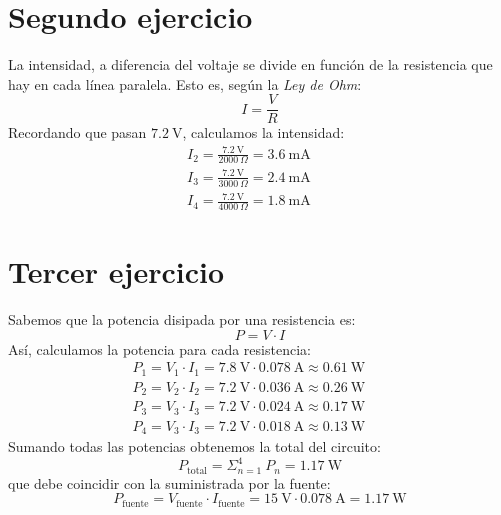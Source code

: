 \documentclass{article}
\newcommand{\tmem}[1]{{\em #1\/}}
\newcommand{\tmop}[1]{\ensuremath{\operatorname{#1}}}
\begin{document}
\section{Segundo ejercicio}

La intensidad, a diferencia del voltaje se divide en funci{\'o}n de la
resistencia que hay en cada l{\'i}nea paralela. Esto es, seg{\'u}n la
{\tmem{Ley de Ohm}}:
\begin{equation}
  I = \frac{V}{R}
\end{equation}
Recordando que pasan $7.2 \:  \text{V}$, calculamos la intensidad:
\begin{eqnarray*}
  I_2 = \frac{7.2 \:  \text{V}}{2000 \: \Omega} = 3.6 \: \text{mA} &  & \\
  I_3 = \frac{7.2 \: \text{V}}{3000 \: \Omega} = 2.4 \: \text{mA} &  & \\
  I_4 = \frac{7.2 \: \text{V}}{4000 \: \Omega} = 1.8 \: \text{mA} &  & 
\end{eqnarray*}

\section{Tercer ejercicio}

Sabemos que la potencia disipada por una resistencia es:
\begin{equation}
  P = V \cdot I
\end{equation}
As{\'i}, calculamos la potencia para cada resistencia:
\begin{eqnarray*}
  P_1 = V_1 \cdot I_1 = 7.8 \: \text{V} \cdot 0.078 \: \text{A} \approx 0.61
  \: \text{W} &  & \\
  P_2 = V_2 \cdot I_2 = 7.2 \: \text{V} \cdot 0.036 \: \text{A} \approx 0.26
  \: \text{W} &  & \\
  P_3 = V_3 \cdot I_3 = 7.2 \: \text{V} \cdot 0.024 \: \text{A} \approx 0.17
  \: \text{W} &  & \\
  P_4 = V_3 \cdot I_3 = 7.2 \: \text{V} \cdot 0.018 \: \text{A} \approx 0.13
  \: \text{W} &  & 
\end{eqnarray*}
Sumando todas las potencias obtenemos la total del circuito:
\[ P_{\tmop{total}} = \Sigma^4_{n = 1} \: P_n = 1.17 \: \text{W} \]
que debe coincidir con la suministrada por la fuente:
\[ P_{\tmop{fuente}} = V_{\tmop{fuente}} \cdot I_{\tmop{fuente}} = 15 \:
   \text{V} \cdot 0.078 \: \text{A} = 1.17 \: \text{W} \]
\end{document}
